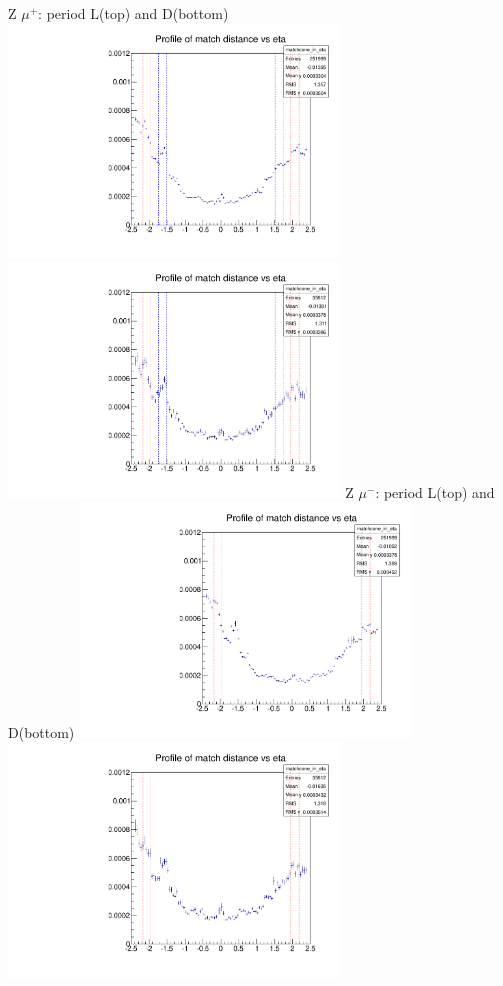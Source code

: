  {
\colb[T]
Z $\mu^+$: period L(top) and D(bottom)
\centering
\includegraphics[width=0.66\textwidth]{dates/20130306/figures/tcone/prof_dataL_z_POS} \\
\includegraphics[width=0.66\textwidth]{dates/20130306/figures/tcone/prof_dataD_z_POS}
Z $\mu^-$: period L(top) and D(bottom)
\centering
\includegraphics[width=0.66\textwidth]{dates/20130306/figures/tcone/prof_dataL_z_NEG} \\
\includegraphics[width=0.66\textwidth]{dates/20130306/figures/tcone/prof_dataD_z_NEG}
\cole
}
